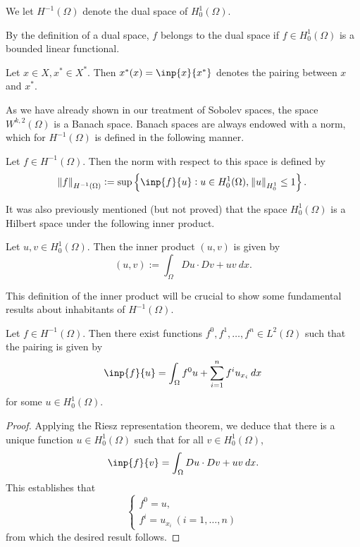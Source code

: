 \documentclass[10pt]{article}
\begin{document}
\begin{definition}
	We let $H^{-1}(\Omega)$ denote the dual space of $H_0^1(\Omega)$. 
\end{definition}
By the definition of a dual space, $f$ belongs to the dual space if $f \in H_0^1(\Omega)$ is a bounded linear functional. 
\begin{definition}
	Let $x \in X, x^* \in X^*$. Then $x^*(x) = \inp{x}{x^*}$ denotes the pairing between $x$ and $x^*$. 
\end{definition}
As we have already shown in our treatment of Sobolev spaces, the space $W^{k,2}(\Omega)$ is a Banach space. Banach spaces are always endowed with a norm, which for $H^{-1}(\Omega)$ is defined in the following manner.
\begin{definition}
	Let $f \in H^{-1}(\Omega)$. Then the norm with respect to this space is defined by 
	\begin{equation*}
		\displaystyle \norm{f}_{H^{-1}(\Omega)} := \sup\left\{ \inp{f}{u} : u \in H_0^1(\Omega), \: \norm{u}_{H_0^1} \leq 1 \right\}.
	\end{equation*}
\end{definition}
It was also previously mentioned (but not proved) that the space $H_0^1(\Omega)$ is a Hilbert space under the following inner product. 
\begin{definition}
	Let $u,v \in H_0^1(\Omega)$. Then the inner product $(u,v)$ is given by 
	\begin{equation*}
		\displaystyle (u,v) := \int_{\Omega}{Du \cdot Dv + uv \: dx}. 
	\end{equation*}
\end{definition}
This definition of the inner product will be crucial to show some fundamental results about inhabitants of $H^{-1}(\Omega)$. 
\begin{theorem}
	Let $f \in H^{-1}(\Omega)$. Then there exist functions $f^0, f^1, \dots, f^n \in L^2(\Omega)$ such that the pairing is given by 
	\begin{equation}
		\label{dual space of hilbert, pairing theorem}
		\displaystyle \inp{f}{u} = \int_{\Omega}{f^0 u + \sum\limits_{i = 1}^{n}{f^i u_{x_i}} \: dx}
	\end{equation}
	for some $u \in H_0^1(\Omega)$. 
\end{theorem}
\begin{proof}
	Applying the Riesz representation theorem, we deduce that there is a unique function $u \in H_0^1(\Omega)$ such that for all $v \in H_0^1(\Omega)$, 
	\begin{equation*}
		\displaystyle \inp{f}{v} = \int_{\Omega}{Du \cdot Dv + uv \: dx}.
	\end{equation*} 
	This establishes that 
	\begin{equation*}
		\displaystyle \begin{cases}
			f^0 = u, \\
			f^i = u_{x_i} \: (i = 1,\dots,n)
		\end{cases}
	\end{equation*}
	from which the desired result follows. 
\end{proof}
\end{document}
